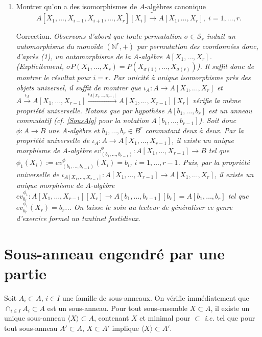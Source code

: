 \documentclass[a4paper, oneside, 12pt]{book}
\theoremstyle{theoremeStyle} %
\theoremstyle{definition} %
\newcommand{\ie}{\textit{i.e.}} %
\newcommand{\N}{\mathbb{N}}
\begin{document}
\begin{enumerate}[leftmargin=* ,parsep=0cm,itemsep=0cm,topsep=0cm]
\item Montrer qu'on a des isomorphismes de $A$-algèbres canonique $$  A[X_1,\dots,X_{i-1},X_{i+1},\dots, X_r][X_i]\tilde{\rightarrow} A[X_1,\dots,X_r],\; i=1,\dots, r.$$

   Correction. \textit{Observons d'abord que toute permutation $\sigma\in \mathcal{S}_r$ induit un automorphisme du monoïde $(\N^r,+)$ par permutation des coordonnées donc, d'après (1), un automorphisme de la $A$-algèbre $A[X_1,\dots, X_r]$. (Explicitement, $\sigma P(X_1,\dots, X_r)=P(X_{\sigma(1)},\dots, X_{\sigma(r)})$). Il suffit donc de montrer le résultat pour $i=r$. Par unicité  à unique isomorphisme près des objets universel, il suffit de montrer que
$\iota_A:A\rightarrow A[X_1,\dots, X_r]$ et $A\stackrel{\iota_A}{\rightarrow} A[X_1,\dots, X_{r-1}]\stackrel{\iota_{A[X_1,\dots, X_{r-1}]}}{\rightarrow} A[X_1,\dots, X_{r-1}][X_r]$ vérifie la même propriété universelle. Notons que par hypothèse  $A[b_1,\dots ,b_r]$ est un anneau commutatif (\textit{cf.} \ref{SousAlg} pour la notation $A[b_1,\dots, b_{r-1}]$). Soit donc $\phi:A\rightarrow B$ une $A$-algèbre et $b_1,\dots, b_r\in B^r$ commutant deux à deux. Par la propriété universelle de $\iota_A:A\rightarrow A[X_1,\dots, X_{r-1}]$, il existe un unique morphisme de $A$-algèbre $ev_{(b_1,\dots, b_{r-1})}^\phi:A[X_1,\dots,X_{r-1}]\rightarrow B$ tel que $\phi_1(X_i):=ev_{(b_1,\dots, b_{r-1})}^\phi(X_i)=b_i$, $i=1,\dots, r-1$. Puis, par la propriété universelle de $\iota_{A[X_1,\dots, X_{r-1}]}:A[X_1,\dots, X_{r-1}]\rightarrow A[X_1,\dots, X_r]$, il existe un unique morphisme de $A$-algèbre $ev_{b_r}^{\phi_1}:A[X_1,\dots,X_{r-1}][X_r]\rightarrow A[b_1,\dots ,b_{r-1}][b_r]=A[b_1,\dots,b_r]$ tel que $ev_{b_r}^{\phi_1}(X_r)=b_r$... On laisse le soin au lecteur de généraliser ce genre d'exercice formel un tantinet fastidieux.} \\

  \end{enumerate}




  \section{Sous-anneau engendré par une partie} Soit  $A_i\subset A$, $i\in I$ une famille de sous-anneaux. On vérifie immédiatement que $\cap_{i\in I}A_i\subset A$ est un sous-anneau. Pour tout sous-ensemble $X\subset A$, il existe
un unique sous-anneau $\langle X\rangle \subset A$, contenant $X$ et minimal pour $\subset$ \ie{} tel que pour  tout sous-anneau $A'\subset A$,   $X\subset A'$ implique  $\langle X\rangle\subset A'$.
\end{document}
